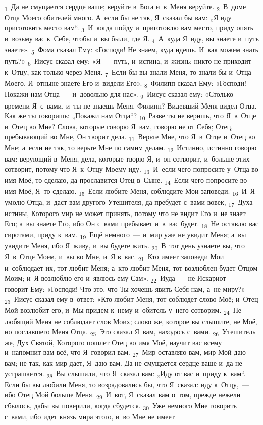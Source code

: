 \documentclass[a4paper,12pt]{article}
\begin{document}
\textsubscript{1}~Да не смущается сердце ваше; веруйте в~Бога и~в~Меня веруйте. \textsubscript{2}~В~доме Отца Моего обителей много. А~если бы не так, Я~сказал бы вам: „Я иду приготовить место вам“. \textsubscript{3}~И~когда пойду и~приготовлю вам место, приду опять и~возьму вас к~Себе, чтобы и~вы были, где Я. \textsubscript{4}~А~куда Я~иду, вы знаете и~путь знаете». \textsubscript{5}~Фома сказал Ему: «Господи! Не знаем, куда идешь. И~как можем знать путь?» \textsubscript{6}~Иисус сказал ему: «Я~--- путь, и~истина, и~жизнь; никто не приходит к~Отцу, как только через Меня. \textsubscript{7}~Если бы вы знали Меня, то знали бы и~Отца Моего. И~отныне знаете Его и~видели Его». \textsubscript{8}~Филипп сказал Ему: «Господи! Покажи нам Отца~--- и~довольно для нас». \textsubscript{9}~Иисус сказал ему: «Столько времени Я~с~вами, и~ты не знаешь Меня, Филипп? Видевший Меня видел Отца. Как же ты говоришь: „Покажи нам Отца“? \textsubscript{10}~Разве ты не веришь, что Я~в~Отце и~Отец во Мне? Слова, которые говорю Я~вам, говорю не от Себя; Отец, пребывающий во Мне, Он творит дела. \textsubscript{11}~Верьте Мне, что Я~в~Отце и~Отец во Мне; а~если не так, то верьте Мне по самим делам. \textsubscript{12}~Истинно, истинно говорю вам: верующий в~Меня, дела, которые творю Я, и~он сотворит, и~больше этих сотворит, потому что Я~к~Отцу Моему иду. \textsubscript{13}~И~если чего попросите у~Отца во имя Моё, то сделаю, да прославится Отец в~Сыне. \textsubscript{14}~Если чего попросите во имя Моё, Я~то сделаю. \textsubscript{15}~Если любите Меня, соблюдите Мои заповеди. \textsubscript{16}~И~Я умолю Отца, и~даст вам другого Утешителя, да пребудет с~вами вовек, \textsubscript{17}~Духа истины, Которого мир не может принять, потому что не видит Его и~не знает Его; а~вы знаете Его, ибо Он с~вами пребывает и~в~вас будет. \textsubscript{18}~Не оставлю вас сиротами, приду к~вам. \textsubscript{19}~Ещё немного~--- и~мир уже не увидит Меня; а~вы увидите Меня, ибо Я~живу, и~вы будете жить. \textsubscript{20}~В~тот день узнаете вы, что Я~в~Отце Моем, и~вы во Мне, и~Я в~вас. \textsubscript{21}~Кто имеет заповеди Мои и~соблюдает их, тот любит Меня; а~кто любит Меня, тот возлюблен будет Отцом Моим; и~Я возлюблю его и~явлюсь ему Сам». \textsubscript{22}~Иуда~--- не Искариот~--- говорит Ему: «Господи! Что это, что Ты хочешь явить Себя нам, а~не миру?» \textsubscript{23}~Иисус сказал ему в~ответ: «Кто любит Меня, тот соблюдет слово Моё; и~Отец Мой возлюбит его, и~Мы придем к~нему и~обитель у~него сотворим. \textsubscript{24}~Не любящий Меня не соблюдает слов Моих; слово же, которое вы слышите, не Моё, но пославшего Меня Отца. \textsubscript{25}~Это сказал Я~вам, находясь с~вами. \textsubscript{26}~Утешитель же, Дух Святой, Которого пошлет Отец во имя Моё, научит вас всему и~напомнит вам всё, что Я~говорил вам. \textsubscript{27}~Мир оставляю вам, мир Мой даю вам; не так, как мир дает, Я~даю вам. Да не смущается сердце ваше и~да не устрашается. \textsubscript{28}~Вы слышали, что Я~сказал вам: „Иду от вас и~приду к~вам“. Если бы вы любили Меня, то возрадовались бы, что Я~сказал: иду к~Отцу,~--- ибо Отец Мой больше Меня. \textsubscript{29}~И~вот, Я~сказал вам о~том, прежде нежели сбылось, дабы вы поверили, когда сбудется. \textsubscript{30}~Уже немного Мне говорить с~вами, ибо идет князь мира этого, и~во Мне не имеет 
\end{document}
